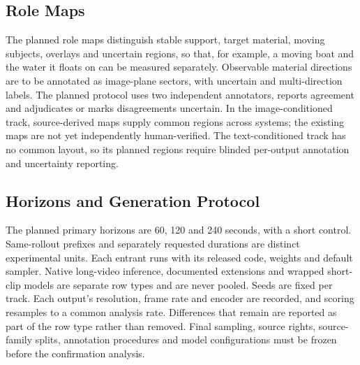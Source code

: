 \subsection{Role Maps}
The planned role maps distinguish stable support, target material, moving subjects, overlays and uncertain regions, so that, for example, a moving boat and the water it floats on can be measured separately. Observable material directions are to be annotated as image-plane sectors, with uncertain and multi-direction labels. The planned protocol uses two independent annotators, reports agreement and adjudicates or marks disagreements uncertain. In the image-conditioned track, source-derived maps supply common regions across systems; the existing maps are not yet independently human-verified. The text-conditioned track has no common layout, so its planned regions require blinded per-output annotation and uncertainty reporting. 

\subsection{Horizons and Generation Protocol}
The planned primary horizons are 60, 120 and 240 seconds, with a short control. Same-rollout prefixes and separately requested durations are distinct experimental units. Each entrant runs with its released code, weights and default sampler. Native long-video inference, documented extensions and wrapped short-clip models are separate row types and are never pooled. Seeds are fixed per track. Each output's resolution, frame rate and encoder are recorded, and scoring resamples to a common analysis rate. Differences that remain are reported as part of the row type rather than removed. Final sampling, source rights, source-family splits, annotation procedures and model configurations must be frozen before the confirmation analysis. 
